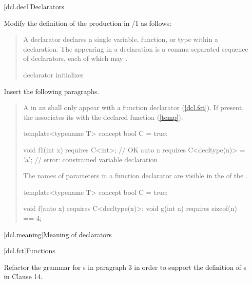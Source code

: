 
[dcl.decl]{Declarators}


Modify the definition of the 
production in /1 as follows:

\begin{quote}
\pnum
A declarator declares a single variable, function, or type within a 
declaration. The 
appearing in a declaration is a comma-separated sequence of declarators, 
each of which may
.

\begin{bnf}
\br
  declarator  initializer\opt
\end{bnf}
\end{quote}

Insert the following paragraphs.

\begin{quote}
\pnum
A  in an
 shall only appear
with a function declarator (\ref{dcl.fct}).
% 
If present, the  associates 
its  with the declared
function (\ref{temp}).
% 
\enterexample
\begin{codeblock}
template<typename T> concept bool C = true;

void f1(int x) requires C<int>;       // OK
auto n requires C<decltype(n)> = 'a'; // error: constrained variable declaration
\end{codeblock}
\exitexample

\pnum
The names of parameters in a function declarator are visible in the
 of the
.
\enterexample
\begin{codeblock}
template<typename T> concept bool C = true;

void f(auto x) requires C<decltype(x)>;
void g(int n) requires sizeof(n) == 4;
\end{codeblock}
\exitexample
\end{quote}


\setcounter{section}{2}
[dcl.meaning]{Meaning of declarators}


\setcounter{section}{4}
[dcl.fct]{Functions}

Refactor the grammar for s in
paragraph 3 in order to support the definition of
s in
Clause 14.

